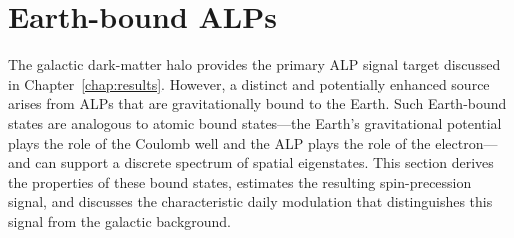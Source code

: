 
\section{Earth-bound ALPs}\label{sec:theory:earthALP}













The galactic dark-matter halo provides the primary ALP signal target discussed in Chapter~\ref{chap:results}.
However, a distinct and potentially enhanced source arises from ALPs that are gravitationally bound to the Earth.
Such Earth-bound states are analogous to atomic bound states---the Earth's gravitational potential plays the role of the Coulomb well and the ALP plays the role of the electron---and can support a discrete spectrum of spatial eigenstates.
This section derives the properties of these bound states, estimates the resulting spin-precession signal, and discusses the characteristic daily modulation that distinguishes this signal from the galactic background.

